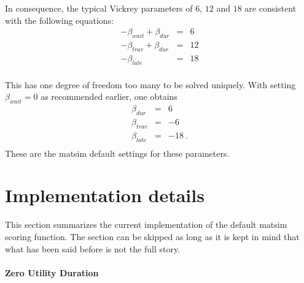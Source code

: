 In consequence, the typical Vickrey parameters of $6$, $12$ and $18$  are consistent with the following equations:
\begin{equation}
\begin{matrix}
-\beta_{wait} + \beta_{dur} & = & 6 \\
-\beta_{trav} + \beta_{dur} & = & 12 \\
- \beta_{late} & = & 18 \\
\end{matrix}
\end{equation}

This has one degree of freedom too many to be solved uniquely.  With setting $\beta_{wait} = 0$ as recommended earlier, one obtains
\begin{equation}
  \begin{matrix}
    \beta_{dur} & = & 6 \\
\beta_{trav} & = & - 6 \\
\beta_{late} & = & - 18 \ .\\
  \end{matrix}
\end{equation}
These are the \gls{matsim} default settings for these parameters.

\section{Implementation details}
\label{sec:scoring-current}
This section summarizes the current implementation of the default \gls{matsim} scoring function. The section can be skipped as long as it is kept in mind that what has been said before is not the full story.

%

\paragraph*{Zero Utility Duration}

